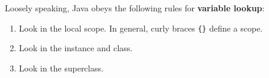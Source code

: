 \begin{blocksection}
Loosely speaking, Java obeys the following rules for \textbf{variable lookup}:

\begin{enumerate}
\item Look in the local scope. In general, curly braces \lstinline${}$ define a
scope.
\item Look in the instance and class.
\item Look in the superclass.
\end{enumerate}
\end{blocksection}
